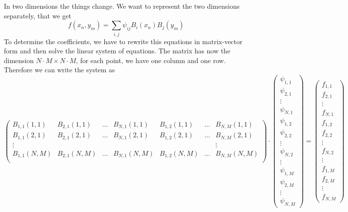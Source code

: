 \documentclass[12pt]{report}
\begin{document}
In two dimensions the things change. We want to represent the two
dimensions separately, that we get
\begin{displaymath}
  f(x_n,y_m)=\sum_{i,j}\psi_{ij}B_i(x_n)B_j(y_m)
\end{displaymath}
To determine the coefficients, we have to rewrite this equations in
matrix-vector form and then solve the linear system of equations. The
matrix has now the dimension $N\cdot M\times N\cdot M$, for each
point, we have one column and one row. Therefore we can write the
system as
\begin{displaymath}
  \left(
    \begin{array}{ccccccc}
      B_{1,1}(1,1) & B_{2,1}(1,1) & \ldots & B_{N,1}(1,1) &
      B_{1,2}(1,1) & \ldots & B_{N,M}(1,1)\\
      B_{1,1}(2,1) & B_{2,1}(2,1) & \ldots & B_{N,1}(2,1) &
      B_{1,2}(2,1) & \ldots & B_{N,M}(2,1)\\
      \vdots & &&&&& \vdots\\
      B_{1,1}(N,M) & B_{2,1}(N,M) & \ldots & B_{N,1}(N,M) &
      B_{1,2}(N,M) & \ldots & B_{N,M}(N,M)\\
    \end{array}
  \right)\cdot\left(
    \begin{array}{c}
      \psi_{1,1}\\\psi_{2,1}\\\vdots\\\psi_{N,1}\\
      \psi_{1,2}\\\psi_{2,2}\\\vdots\\\psi_{N,2}\\
      \vdots\\
      \psi_{1,M}\\\psi_{2,M}\\\vdots\\\psi_{N,M}
    \end{array}
  \right) = \left(
    \begin{array}{c}
      f_{1,1}\\f_{2,1}\\\vdots\\f_{N,1}\\
      f_{1,2}\\f_{2,2}\\\vdots\\f_{N,2}\\
      \vdots\\
      f_{1,M}\\f_{2,M}\\\vdots\\f_{N,M}
    \end{array}
  \right)
\end{displaymath}
\end{document}
